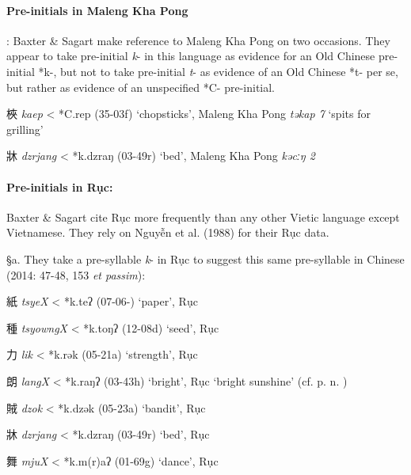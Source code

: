 \paragraph{Pre-initials in Maleng Kha Pong}:
Baxter \& Sagart make reference to Maleng Kha Pong on two occasions.
They appear to take pre-initial \emph{k}- in this language as evidence
for an Old Chinese pre-initial *k-, but not to take pre-initial
 \emph{t}- as evidence of an Old Chinese *t- per se, but rather as
evidence of an unspecified *C- pre-initial.

\begin{description} \item
梜  \emph{kaep} \textless{} *C.{}rep (35-03f) `chopsticks', Maleng Kha
Pong \emph{təkap 7} `spits for grilling'

\item
牀  \emph{dzrjang} \textless{} *k.dzraŋ (03-49r) `bed', Maleng Kha Pong
 \emph{kəc{}ːŋ 2}
\end{description}

\paragraph{Pre-initials in Rục:}
Baxter \& Sagart cite Rục more frequently than any other Vietic language
except Vietnamese. They rely on Nguyễn et al. (1988) for their Rục data.

§a. They take a pre-syllable \emph{k}- in Rục to suggest this same
pre-syllable in Chinese (2014: 47-48, 153  \emph{et passim}):

\begin{description} \item
紙 \emph{tsyeX} \textless{} *k.teʔ (07-06-) `paper', Rục \emph{}

\item
種 \emph{tsyowngX} \textless{} *k.toŋʔ (12-08d) `seed', Rục \emph{}

\item
力 \emph{lik} \textless{} *k.rək (05-21a) `strength', Rục \emph{}

\item
朗 \emph{langX} \textless{} *k.r{}aŋʔ (03-43h) `bright', Rục \emph{}
`bright sunshine' (cf. p. n. )

\item
賊 \emph{dzok} \textless{} *k.dz{}ək (05-23a) `bandit', Rục \emph{}

\item
牀 \emph{dzrjang} \textless{} *k.dzraŋ (03-49r) `bed', Rục \emph{}

\item
舞 \emph{mjuX} \textless{} *k.m(r)aʔ (01-69g) `dance', Rục \emph{}
\end{description}

